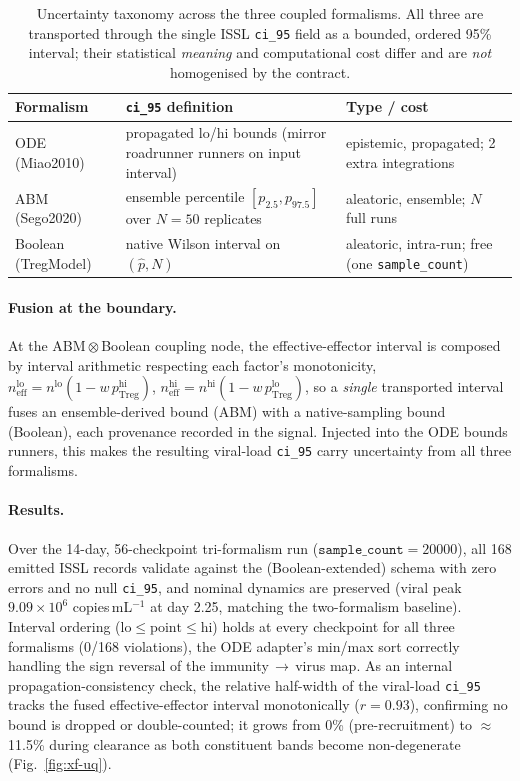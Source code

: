 \documentclass[conference,letterpaper,10pt]{IEEEtran}
\begin{document}
\begin{table}[t]
\centering
\caption{Uncertainty taxonomy across the three coupled formalisms. All
three are transported through the single ISSL \texttt{ci\_95} field as a
bounded, ordered 95\% interval; their statistical \emph{meaning} and
computational cost differ and are \emph{not} homogenised by the
contract.}
\label{tab:uq-taxonomy}
\renewcommand{\arraystretch}{1.0}
\footnotesize
\begin{tabularx}{\columnwidth}{@{}lXX@{}}
\toprule
\textbf{Formalism} & \textbf{\texttt{ci\_95} definition} & \textbf{Type / cost}\\
\midrule
ODE (Miao2010)    & propagated lo/hi bounds (mirror roadrunner runners on input interval) & epistemic, propagated; 2 extra integrations\\
ABM (Sego2020)    & ensemble percentile $[p_{2.5},p_{97.5}]$ over $N{=}50$ replicates & aleatoric, ensemble; $N$ full runs\\
Boolean (TregModel) & native Wilson interval on $(\hat p, N)$ & aleatoric, intra-run; free (one \texttt{sample\_count})\\
\bottomrule
\end{tabularx}
\end{table}

\paragraph{Fusion at the boundary.} At the ABM\,$\otimes$\,Boolean coupling
node, the effective-effector interval is composed by interval arithmetic
respecting each factor's monotonicity,
$n_{\text{eff}}^{\text{lo}} = n^{\text{lo}}(1-w\,p_{\text{Treg}}^{\text{hi}})$,
$n_{\text{eff}}^{\text{hi}} = n^{\text{hi}}(1-w\,p_{\text{Treg}}^{\text{lo}})$,
so a \emph{single} transported interval fuses an ensemble-derived bound
(ABM) with a native-sampling bound (Boolean), each provenance recorded in
the signal. Injected into the ODE bounds runners, this makes the resulting
viral-load \texttt{ci\_95} carry uncertainty from all three formalisms.

\paragraph{Results.} Over the 14-day, 56-checkpoint tri-formalism run
($\texttt{sample\_count}=20000$), all 168 emitted ISSL records validate
against the (Boolean-extended) schema with zero errors and no null
\texttt{ci\_95}, and nominal dynamics are preserved (viral peak
$9.09\times10^{6}$ copies\,mL$^{-1}$ at day 2.25, matching the two-formalism
baseline). Interval ordering ($\text{lo}\le\text{point}\le\text{hi}$) holds
at every checkpoint for all three formalisms (0/168 violations), the ODE
adapter's min/max sort correctly handling the sign reversal of the
immunity\,$\to$\,virus map. As an internal propagation-consistency check,
the relative half-width of the viral-load \texttt{ci\_95} tracks the fused
effective-effector interval monotonically ($r=0.93$), confirming no bound is
dropped or double-counted; it grows from 0\% (pre-recruitment) to
$\approx$11.5\% during clearance as both constituent bands become
non-degenerate (Fig.~\ref{fig:xf-uq}).
\end{document}
